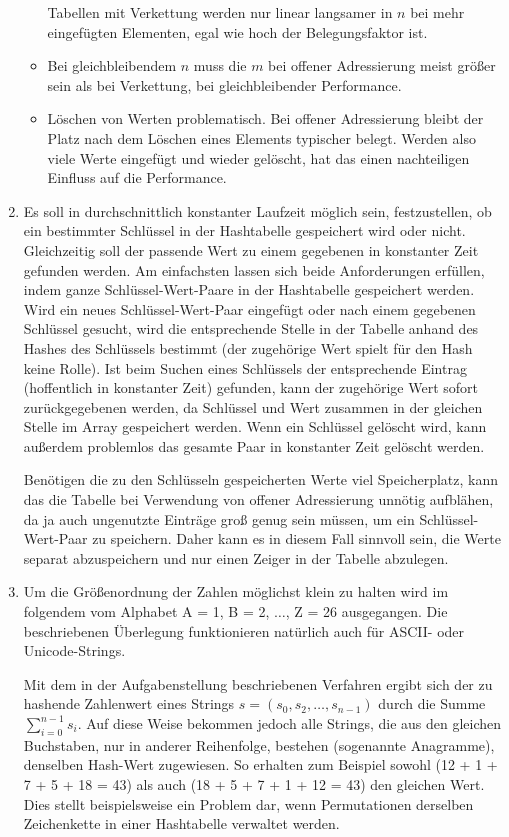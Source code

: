 \documentclass[11pt,a4paper]{article}
\begin{document}
\begin{loesung}
\begin{enumerate}
\begin{itemize}
            Tabellen mit Verkettung werden nur linear langsamer in $n$ bei mehr eingefügten Elementen, egal wie hoch der Belegungsfaktor ist.
            \item Bei gleichbleibendem $n$ muss die $m$ bei offener Adressierung meist größer sein als bei Verkettung, bei gleichbleibender Performance.
            \item Löschen von Werten problematisch.
            Bei offener Adressierung bleibt der Platz nach dem Löschen eines Elements typischer belegt.
            Werden also viele Werte eingefügt und wieder gelöscht, hat das einen nachteiligen Einfluss auf die Performance.
        \end{itemize}
        \item
        Es soll in durchschnittlich konstanter Laufzeit möglich sein, festzustellen, ob ein bestimmter Schlüssel in der Hashtabelle gespeichert wird oder nicht.
        Gleichzeitig soll der passende Wert zu einem gegebenen in konstanter Zeit gefunden werden.
        Am einfachsten lassen sich beide Anforderungen erfüllen, indem ganze Schlüssel-Wert-Paare in der Hashtabelle gespeichert werden.
        Wird ein neues Schlüssel-Wert-Paar eingefügt oder nach einem gegebenen Schlüssel gesucht, wird die entsprechende Stelle in der Tabelle anhand des Hashes des Schlüssels bestimmt (der zugehörige Wert spielt für den Hash keine Rolle).
        Ist beim Suchen eines Schlüssels der entsprechende Eintrag (hoffentlich in konstanter Zeit) gefunden, kann der zugehörige Wert sofort zurückgegebenen werden, da Schlüssel und Wert zusammen in der gleichen Stelle im Array gespeichert werden.
        Wenn ein Schlüssel gelöscht wird, kann außerdem problemlos das gesamte Paar in konstanter Zeit gelöscht werden.

        Benötigen die zu den Schlüsseln gespeicherten Werte viel Speicherplatz, kann das die Tabelle bei Verwendung von offener Adressierung unnötig aufblähen, da ja auch ungenutzte Einträge groß genug sein müssen, um ein Schlüssel-Wert-Paar zu speichern.
        Daher kann es in diesem Fall sinnvoll sein, die Werte separat abzuspeichern und nur einen Zeiger in der Tabelle abzulegen.
        
        \item 
        Um die Größenordnung der Zahlen möglichst klein zu halten wird im folgendem vom Alphabet A = 1, B = 2, $\ldots$, Z = 26 ausgegangen.
        Die beschriebenen Überlegung funktionieren natürlich auch für ASCII- oder Unicode-Strings.

        Mit dem in der Aufgabenstellung beschriebenen Verfahren ergibt sich der zu hashende Zahlenwert eines Strings $s = (s_0, s_2, \ldots, s_{n - 1})$ durch die Summe $\sum_{i = 0}^{n - 1} s_i$.
        Auf diese Weise bekommen jedoch alle Strings, die aus den gleichen Buchstaben, nur in anderer Reihenfolge, bestehen (sogenannte Anagramme), denselben Hash-Wert zugewiesen.
        So erhalten zum Beispiel sowohl  (12 + 1 + 7 + 5 + 18 = 43) als auch  (18 + 5 + 7 + 1 + 12 = 43) den gleichen Wert.
        Dies stellt beispielsweise ein Problem dar, wenn Permutationen derselben Zeichenkette in einer Hashtabelle verwaltet werden.


\end{enumerate}
\end{loesung}
\end{document}
